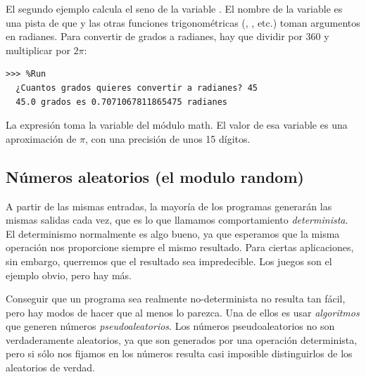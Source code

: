   
 

El segundo ejemplo calcula el seno de la variable . El
nombre de la variable es una pista de que  y las otras
funciones trigonométricas (, , etc.) toman
argumentos en radianes. Para convertir de grados a radianes, hay que
dividir por 360 y multiplicar por \(2\pi\):




\begin{Verbatim}[frame=single]
>>> %Run 
  ¿Cuantos grados quieres convertir a radianes? 45
  45.0 grados es 0.7071067811865475 radianes
\end{Verbatim}

La expresión  toma la variable  del módulo
math. El valor de esa variable es una aproximación de \(\pi\), con una
precisión de unos 15 dígitos.


\hypertarget{nuxfameros-aleatorios}{%
\subsection{Números aleatorios (el modulo random)}\label{nuxfameros-aleatorios}}

 
 

A partir de las mismas entradas, la mayoría de los programas generarán
las mismas salidas cada vez, que es lo que llamamos comportamiento
\emph{determinista}. El determinismo normalmente es algo bueno, ya que
esperamos que la misma operación nos proporcione siempre el mismo
resultado. Para ciertas aplicaciones, sin embargo, querremos que el
resultado sea impredecible. Los juegos son el ejemplo obvio, pero hay
más.

Conseguir que un programa sea realmente no-determinista no resulta tan
fácil, pero hay modos de hacer que al menos lo parezca. Una de ellos es
usar \emph{algoritmos} que generen números \emph{pseudoaleatorios}. Los
números pseudoaleatorios no son verdaderamente aleatorios, ya que son
generados por una operación determinista, pero si sólo nos fijamos en
los números resulta casi imposible distinguirlos de los aleatorios de
verdad.

 

